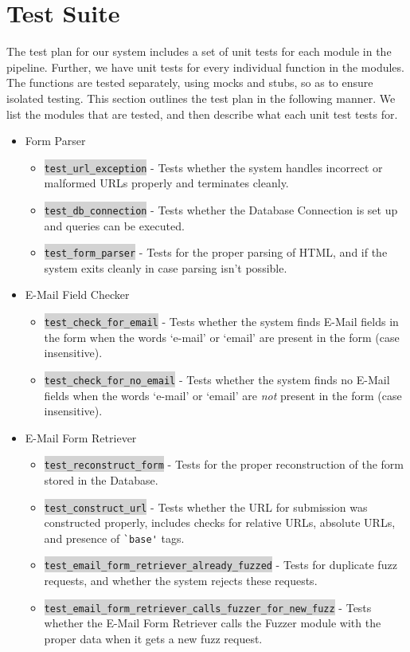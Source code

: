 \section{Test Suite}
\label{Arch:Test}
The test plan for our system includes a set of unit tests for each module in the pipeline. Further, we have unit tests for every %
individual function in the modules. The functions are tested separately, using mocks and stubs, so as to ensure isolated testing.
This section outlines the test plan in the following manner. We list the modules that are tested, and then describe what each unit test tests for.
\begin{itemize}
	\item Form Parser
	\begin{itemize}
		\item \colorbox{lightgray}{\lstinline{test_url_exception}} - Tests whether the system handles incorrect or malformed URLs properly and terminates cleanly.
		\item \colorbox{lightgray}{\lstinline{test_db_connection}} - Tests whether the Database Connection is set up and queries can be executed.
		\item \colorbox{lightgray}{\lstinline{test_form_parser}} - Tests for the proper parsing of HTML, and if the system exits cleanly in case parsing isn't possible.
	\end{itemize}
	
	\item E-Mail Field Checker
	\begin{itemize}
		\item \colorbox{lightgray}{\lstinline{test_check_for_email}} - Tests whether the system finds E-Mail fields in the form when the words `e-mail' or `email' are present in the form (case insensitive).
		\item \colorbox{lightgray}{\lstinline{test_check_for_no_email}} - Tests whether the system finds no E-Mail fields when the words `e-mail' or `email' are \emph{not} present in the form (case insensitive).
	\end{itemize}
	
	\item E-Mail Form Retriever
	\begin{itemize}
		\item \colorbox{lightgray}{\lstinline{test_reconstruct_form}} - Tests for the proper reconstruction of the form stored in the Database.
		\item \colorbox{lightgray}{\lstinline{test_construct_url}} - Tests whether the URL for submission was constructed properly, includes checks for relative URLs, absolute URLs, and presence of \lstinline{`base'} tags.
		\item \colorbox{lightgray}{\lstinline{test_email_form_retriever_already_fuzzed}} - Tests for duplicate fuzz requests, and whether the system rejects these requests.
		\item \colorbox{lightgray}{\lstinline{test_email_form_retriever_calls_fuzzer_for_new_fuzz}} - Tests whether the E-Mail Form Retriever calls the Fuzzer module with the proper data when it gets a new fuzz request.
	\end{itemize}
	

\end{itemize}

